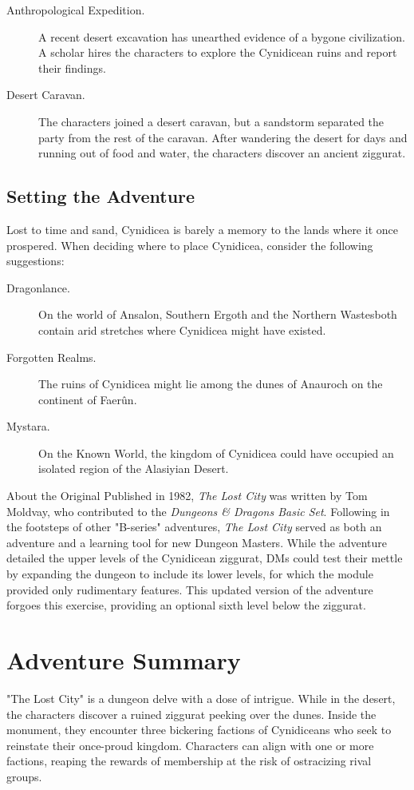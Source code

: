 \documentclass[10pt,a4paper,twoside,bg=print,twocolumn,openany,nodeprecatedcode]{dndbook}
\begin{document}
\begin{description}
\item[Anthropological Expedition.]
A recent desert excavation has unearthed evidence of a bygone civilization. A scholar hires the characters to explore the Cynidicean ruins and report their findings.
\item[Desert Caravan.]
The characters joined a desert caravan, but a sandstorm separated the party from the rest of the caravan. After wandering the desert for days and running out of food and water, the characters discover an ancient ziggurat.
\end{description}

\subsection{Setting the Adventure}
Lost to time and sand, Cynidicea is barely a memory to the lands where it once prospered. When deciding where to place Cynidicea, consider the following suggestions:


\begin{description}
\item[Dragonlance.]
On the world of Ansalon, Southern Ergoth and the Northern Wastesboth contain arid stretches where Cynidicea might have existed.
\item[Forgotten Realms.]
The ruins of Cynidicea might lie among the dunes of Anauroch on the continent of Faerûn.
\item[Mystara.]
On the Known World, the kingdom of Cynidicea could have occupied an isolated region of the Alasiyian Desert.
\end{description}

\begin{DndReadAloud}{About the Original}
Published in 1982, \textit{The Lost City} was written by Tom Moldvay, who contributed to the \textit{Dungeons \& Dragons Basic Set}. Following in the footsteps of other "B-series" adventures, \textit{The Lost City} served as both an adventure and a learning tool for new Dungeon Masters. While the adventure detailed the upper levels of the Cynidicean ziggurat, DMs could test their mettle by expanding the dungeon to include its lower levels, for which the module provided only rudimentary features. This updated version of the adventure forgoes this exercise, providing an optional sixth level below the ziggurat.

\end{DndReadAloud}

\section{Adventure Summary}
"The Lost City" is a dungeon delve with a dose of intrigue. While in the desert, the characters discover a ruined ziggurat peeking over the dunes. Inside the monument, they encounter three bickering factions of Cynidiceans who seek to reinstate their once-proud kingdom. Characters can align with one or more factions, reaping the rewards of membership at the risk of ostracizing rival groups.
\end{document}

